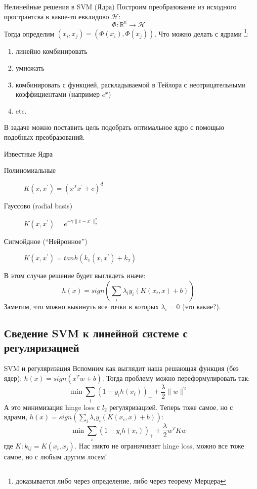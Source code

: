 \documentclass[14pt, fleqn, xcolor={dvipsnames, table}]{beamer}
\begin{document}
\begin{frame}{Нелинейные решения в SVM (Ядра)}
Построим преобразование из исходного пространтсва в какое-то евклидово $\mathcal{H}$:
$$
\Phi: \mathbb{R}^n \to \mathcal{H}
$$
Тогда определим $(x_i, x_j) = (\Phi(x_i), \Phi(x_j))$. Что можно делать с ядрами \footnote{доказывается либо через определение, либо через теорему Мерцера}:
\begin{enumerate}
  \item линейно комбинировать
  \item умножать
  \item комбинировать с функцией, раскладываемой в Тейлора с неотрицательными коэффициентами (например $e^x$)
  \item etc.
\end{enumerate}
В задаче можно поставить цель подобрать оптимальное ядро с помощью подобных преобразований.
\end{frame}

\begin{frame}{Известные Ядра}
\small
\begin{description}
  \item[Полиномиальные] $K(x,x^{'}) = (x^Tx^{'} + c)^d$ 
  \item[Гауссово (radial basis)] $K(x,x^{'}) = e^{-\gamma \|x - x^{'}\|_2^2}$ 
  \item[Сигмойдное (``Нейронное'')] $K(x,x^{'}) = tanh(k_1 (x,x^{'}) + k_2)$ 
\end{description}
В этом случае решение будет выглядеть иначе:
$$
h(x) = sign \left(\sum_i \lambda_i y_i (K(x_i, x) + b)\right)
$$
Заметим, что можно выкинуть все точки в которых $\lambda_i = 0$ (это какие?).
\end{frame}

\subsection{Сведение SVM к линейной системе с регуляризацией} %

\begin{frame}{SVM и регуляризация}
\small
Вспомним как выглядит наша решающая функция (без ядер): $h(x) = sign(x^T w + b)$. Тогда проблему можно переформулировать так:
$$
\min \sum_i (1 - y_i h(x_i))_+ + \frac{\lambda}{2} \|w\|^2
$$
А это минимизация hinge loss с $l_2$ регуляризацией. Теперь тоже самое, но с ядрами, $h(x) = sign \left(\sum_i \lambda_i y_i (K(x_i, x) + b)\right)$:
$$
\min \sum_i (1 - y_i h(x_i))_+ + \frac{\lambda}{2} w^T K w
$$
где $K : k_{ij} = K(x_i, x_j)$. Нас никто не ограничивает hinge loss, можно все тоже самое, но с любым другим лосем!
\end{frame}
\end{document}
